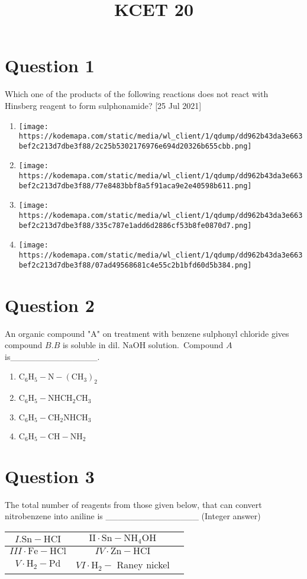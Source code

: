 \documentclass{article}
\title{KCET 20}
\begin{document}
                    \maketitle
                    \section*{Question 1}
Which one of the products of the following reactions does not react with Hinsberg reagent to form sulphonamide? [25 Jul 2021]
\begin{enumerate}[label=(\alph*)]
\item \texttt{[image: https://kodemapa.com/static/media/wl\_client/1/qdump/dd962b43da3e663bef2c213d7dbe3f88/2c25b5302176976e694d20326b655cbb.png]}
\item \texttt{[image: https://kodemapa.com/static/media/wl\_client/1/qdump/dd962b43da3e663bef2c213d7dbe3f88/77e8483bbf8a5f91aca9e2e40598b611.png]}
\item \texttt{[image: https://kodemapa.com/static/media/wl\_client/1/qdump/dd962b43da3e663bef2c213d7dbe3f88/335c787e1add6d2886cf53b8fe0870d7.png]}
\item \texttt{[image: https://kodemapa.com/static/media/wl\_client/1/qdump/dd962b43da3e663bef2c213d7dbe3f88/07ad49568681c4e55c2b1bfd60d5b384.png]}
\end{enumerate}
\newpage
\section*{Question 2}
An organic compound "A" on treatment with benzene sulphonyl chloride gives compound \(B . B\) is soluble in dil. \(\mathrm{NaOH}\) solution. Compound \(A\) is______________. 
\begin{enumerate}[label=(\alph*)]
\item \(\mathrm{C}_6 \mathrm{H}_5-\mathrm{N}-\left(\mathrm{CH}_3\right)_2\)
\item \(\mathrm{C}_6 \mathrm{H}_5-\mathrm{NHCH}_2 \mathrm{CH}_3\)
\item \(\mathrm{C}_6 \mathrm{H}_5-\mathrm{CH}_2 \mathrm{NHCH}_3\)
\item \(\mathrm{C}_6 \mathrm{H}_5-\mathrm{CH}-\mathrm{NH}_2\)
\end{enumerate}
\newpage
\section*{Question 3}
The total number of reagents from those given below, that can convert nitrobenzene into aniline is _______________ (Integer answer)\begin{tabular}{|c|c|c|}
\hline
\(I . \mathrm{Sn}-\mathrm{HCI}\) & \(\mathrm{II} \cdot \mathrm{Sn}-\mathrm{NH}_4 \mathrm{OH}\) \\
\hline
\(I I I \cdot \mathrm{Fe}-\mathrm{HCl}\) & \(I V \cdot \mathrm{Zn}-\mathrm{HCI}\) \\
\hline
\(V \cdot \mathrm{H}_2-\mathrm{Pd}\) & \(V I \cdot \mathrm{H}_2-\) Raney nickel \\
\hline
\end{tabular}
\end{document}
